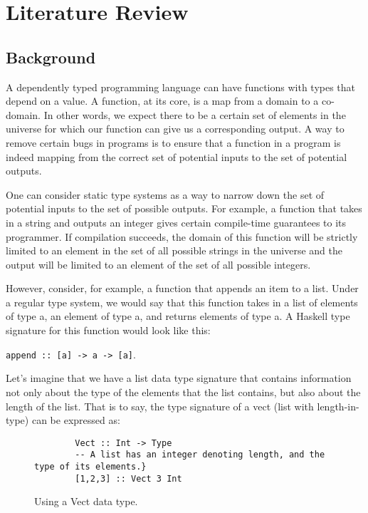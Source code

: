 
\chapter{Literature Review}

\section{Background}
A dependently typed programming language can have functions with types that
depend on a value. A function, at its core, is a map from a domain to a
co-domain. In other words, we expect there to be a certain set of elements in
the universe for which our function can give us a corresponding output. A way to
remove certain bugs in programs is to ensure that a function in a program is
indeed mapping from the correct set of potential inputs to the set of potential
outputs. 

One can consider static type systems as a way to narrow down the set of
potential inputs to the set of possible outputs. For example, a function that
takes in a string and outputs an integer gives certain compile-time guarantees
to its programmer. If compilation succeeds, the domain of this function will be
strictly limited to an element in the set of all possible strings in the
universe and the output will be limited to an element of the set of all possible
integers. 

However, consider, for example, a function that appends an item to a list. Under
a regular type system, we would say that this function takes in a list of
elements of type a, an element of type a, and returns elements of type a. A
Haskell type signature for this function would look like this: 

\texttt{append :: [a] -> a -> [a]}. 


Let's imagine that we have a list data type signature that contains information
not only about the type of the elements that the list contains, but also about
the length of the list. That is to say, the type signature of a vect (list with
length-in-type) can be expressed as: 

\begin{figure}
    \caption{Using a Vect data type.}
    \begin{lstlisting}
        Vect :: Int -> Type
        -- A list has an integer denoting length, and the type of its elements.}
        [1,2,3] :: Vect 3 Int
    \end{lstlisting}
\end{figure} 


